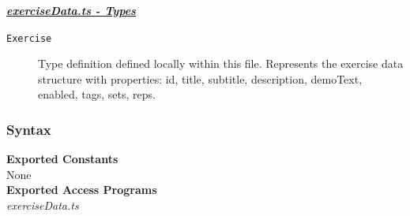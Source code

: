 \documentclass[12pt, titlepage]{article}
\begin{document}
\noindent \underline{\textbf{\textit{exerciseData.ts - Types}}}
\begin{description}
\item[\texttt{Exercise}] 
    Type definition defined locally within this file. Represents the exercise data structure with properties: id, title, subtitle, description, demoText, enabled, tags, sets, reps.
\end{description}

\subsubsection{Syntax}

\noindent \textbf{Exported Constants}\\
None \\

\noindent \textbf{Exported Access Programs}\\
\textit{exerciseData.ts}
\end{document}
